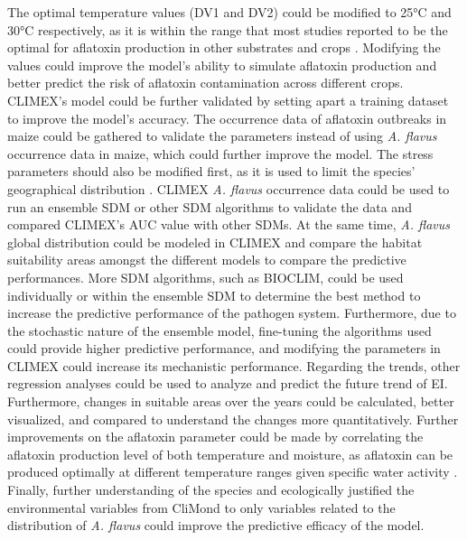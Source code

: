 The optimal temperature values (DV1 and DV2) could be modified to 25°C and 30°C respectively, as it is within the range that most studies reported to be the optimal for aflatoxin production in other substrates and crops \citep{hassane2017influence} \citep{mannaa2017influence} \citep{norlia2020modelling} \citep{haerani2020climate}  . Modifying the values could improve the model's ability to simulate aflatoxin production and better predict the risk of aflatoxin contamination across different crops. CLIMEX's model could be further validated by setting apart a training dataset to improve the model's accuracy. The occurrence data of aflatoxin outbreaks in maize could be gathered to validate the parameters instead of using \textit{A. flavus} occurrence data in maize, which could further improve the model. The stress parameters should also be modified first, as it is used to limit the species' geographical distribution \citep{haerani2020climate}. CLIMEX \textit{A. flavus} occurrence data could be used to run an ensemble SDM or other SDM algorithms to validate the data and compared CLIMEX's AUC value \citep{early2022comparing} with other SDMs. At the same time, \textit{A. flavus} global distribution could be modeled in CLIMEX and compare the habitat suitability areas amongst the different models to compare the predictive performances. More SDM algorithms, such as BIOCLIM, could be used individually or within the ensemble SDM to determine the best method to increase the predictive performance of the pathogen system. Furthermore, due to the stochastic nature of the ensemble model, fine-tuning the algorithms used could provide higher predictive performance, and modifying the parameters in CLIMEX could increase its mechanistic performance. Regarding the trends, other regression analyses could be used to analyze and predict the future trend of EI. Furthermore, changes in suitable areas over the years could be calculated, better visualized, and compared to understand the changes more quantitatively. Further improvements on the aflatoxin parameter could be made by correlating the aflatoxin production level of both temperature and moisture, as aflatoxin can be produced optimally at different temperature ranges given specific water activity \citep{mannaa2017influence}. Finally, further understanding of the species and ecologically justified the environmental variables from CliMond \citep{kriticos2012climond} to only variables related to the distribution of \textit{A. flavus} could improve the predictive efficacy of the model.